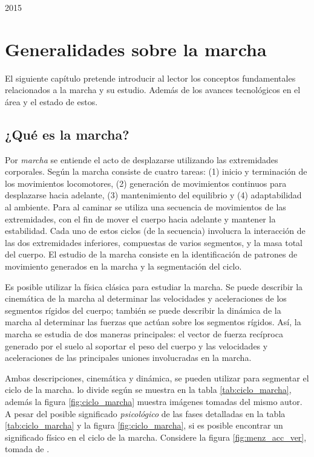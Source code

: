 2015\chapter[Generalidades]{Generalidades sobre la marcha}

El siguiente capítulo pretende introducir al lector los conceptos fundamentales relacionados a la marcha y su estudio. Además de los avances tecnológicos en el área y el estado de estos.

\section{¿Qué es la marcha?}

Por \emph{marcha} se entiende el acto de desplazarse utilizando las extremidades corporales. Según \cite{menz} la marcha consiste de cuatro tareas: (1) inicio y terminación de los movimientos locomotores, (2) generación de movimientos continuos para desplazarse hacia adelante, (3) mantenimiento del equilibrio y (4) adaptabilidad al ambiente. Para \cite{perry} al caminar se utiliza una secuencia de movimientos de las extremidades, con el fin de mover el cuerpo hacia adelante y mantener la estabilidad. Cada uno de estos ciclos (de la secuencia) involucra la interacción de las dos extremidades inferiores, compuestas de varios segmentos, y la masa total del cuerpo. El estudio de la marcha consiste en la identificación de patrones de movimiento generados en la marcha y la segmentación del ciclo.

Es posible utilizar la física clásica para estudiar la marcha. Se puede describir la cinemática de la marcha al determinar las velocidades y aceleraciones de los segmentos rígidos del cuerpo; también se puede describir la dinámica de la marcha al determinar las fuerzas que actúan sobre los segmentos rígidos. Así, la marcha se estudia de dos maneras principales: el vector de fuerza recíproca generado por el suelo al soportar el peso del cuerpo y las velocidades y aceleraciones de las principales uniones involucradas en la marcha. \citep{perry}

Ambas descripciones, cinemática y dinámica, se pueden utilizar para segmentar el ciclo de la marcha. \cite{perry} lo divide según se muestra en la tabla \ref{tab:ciclo_marcha}, además la figura \ref{fig:ciclo_marcha} muestra imágenes tomadas del mismo autor. A pesar del posible significado \emph{psicológico} de las fases detalladas en la tabla \ref{tab:ciclo_marcha} y la figura \ref{fig:ciclo_marcha}, si es posible encontrar un significado físico en el ciclo de la marcha. Considere la figura \ref{fig:menz_acc_ver}, tomada de \citep{menz}.


